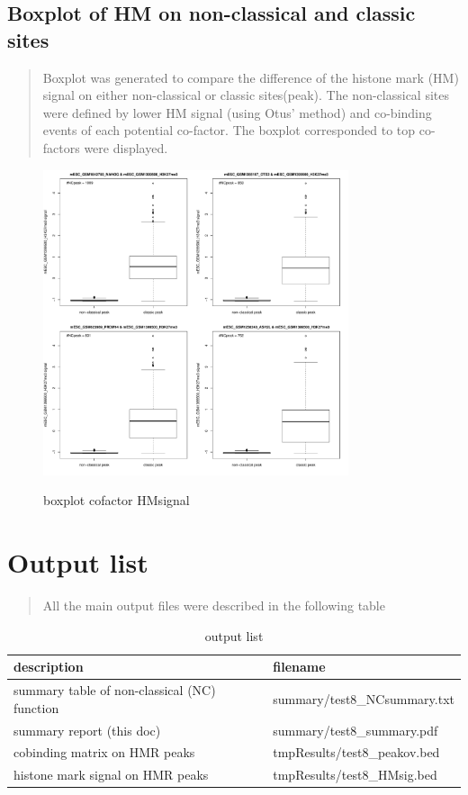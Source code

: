 \documentclass[11pt,a4paper]{article}
\begin{document}
\subsection{Boxplot of HM on non-classical and classic sites}
\begin{quotation}
Boxplot was generated to compare the difference of the histone mark (HM) signal on either non-classical or classic sites(peak). The non-classical sites were defined by lower HM signal (using Otus' method) and co-binding events of each potential co-factor. The boxplot corresponded to top co-factors were displayed.  
\end{quotation}
\begin{figure}[h]
        \caption{boxplot cofactor HMsignal} \label{fig:profileunion}
        \setlength{\abovecaptionskip}{0pt}
        \setlength{\belowcaptionskip}{10pt}
        \centering
        {\includegraphics[width=0.8\textwidth]{test8_coTF_HMsignal.pdf}}
\end{figure}

\newpage
\newpage
\section{Output list}
\begin{quotation}
All the main output files were described in the following table
\end{quotation}
\begin{table}[h]
\small
\caption{output list}\label{bstable}
\begin{tabular}{ |l|l| }
    
\hline
description & filename \\
\hline
summary table of non-classical (NC) function & summary/test8\_NCsummary.txt \\
\hline
summary report (this doc) & summary/test8\_summary.pdf \\
\hline
cobinding matrix on HMR peaks & tmpResults/test8\_peakov.bed \\
\hline
histone mark signal on HMR peaks & tmpResults/test8\_HMsig.bed \\
\hline

\end{tabular}
\end{table} 
\end{document}
